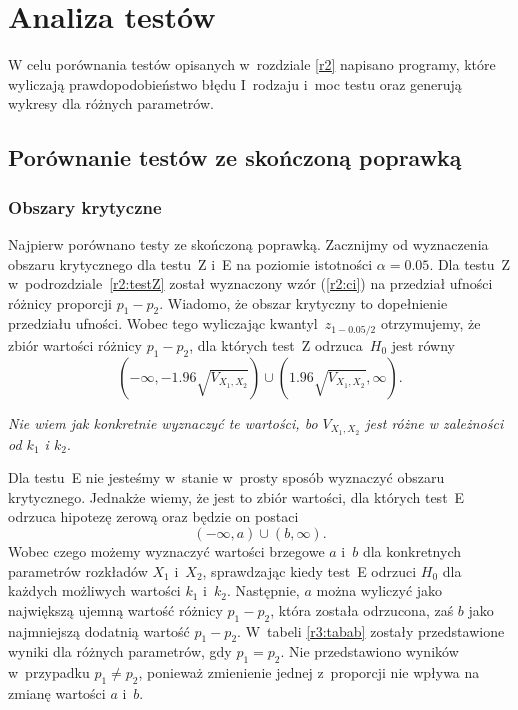 \chapter{Analiza testów}
\label{r3}

W celu porównania testów opisanych w~rozdziale \ref{r2} napisano programy, które wyliczają prawdopodobieństwo błędu I~rodzaju i~moc testu oraz generują wykresy dla różnych parametrów.

\section{Porównanie testów ze skończoną poprawką}
\label{r3:skonczonetesty}

\subsection{Obszary krytyczne}
Najpierw porównano testy ze skończoną poprawką. Zacznijmy od wyznaczenia obszaru krytycznego dla testu~Z i~E na poziomie istotności $\alpha = 0.05$. Dla testu~Z w~podrozdziale~\ref{r2:testZ} został wyznaczony wzór (\ref{r2:ci}) na przedział ufności różnicy proporcji $p_1-p_2$. Wiadomo, że obszar krytyczny to dopełnienie przedziału ufności. Wobec tego wyliczając kwantyl~$z_{1-0.05/2}$ otrzymujemy, że zbiór wartości różnicy $p_1-p_2$, dla których test~Z odrzuca~$H_0$ jest równy
\begin{equation}
\left(-\infty,-1.96\sqrt{V_{X_1,X_2}}\right)\cup \left(1.96\sqrt{V_{X_1,X_2}}, \infty\right).
\end{equation}

\textit{Nie wiem jak konkretnie wyznaczyć te wartości, bo $V_{X_1,X_2}$ jest różne w zależności od $k_1$ i $k_2$}.

Dla testu~E nie jesteśmy w~stanie w~prosty sposób wyznaczyć obszaru krytycznego. Jednakże wiemy, że jest to zbiór wartości, dla których test~E odrzuca hipotezę zerową oraz będzie on postaci
\begin{equation}
(-\infty,a)\cup (b, \infty).
\end{equation}
Wobec czego możemy wyznaczyć wartości brzegowe $a$ i~$b$ dla konkretnych parametrów rozkładów $X_1$ i~$X_2$, sprawdzając kiedy test~E odrzuci $H_0$ dla każdych możliwych wartości $k_1$ i~$k_2$. Następnie, $a$ można wyliczyć jako największą ujemną wartość różnicy $p_1-p_2$, która została odrzucona, zaś $b$ jako najmniejszą dodatnią wartość $p_1-p_2$. W~tabeli \ref{r3:tabab} zostały przedstawione wyniki dla różnych parametrów, gdy $p_1=p_2$. Nie przedstawiono wyników w~przypadku $p_1\neq p_2$, ponieważ zmienienie jednej z~proporcji nie wpływa na zmianę wartości $a$ i~$b$.

